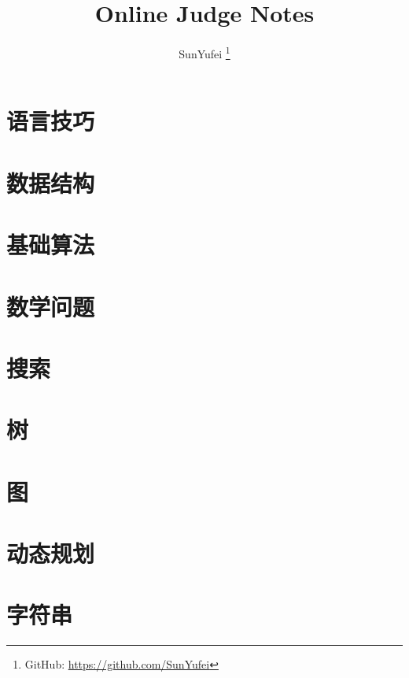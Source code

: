 \documentclass{template}
\title{Online Judge Notes}
\author{SunYufei \thanks{GitHub: \href{https://github.com/SunYufei}{https://github.com/SunYufei}}}
\begin{document}
	\maketitle
	
	\tableofcontents
	
	\newpage
	\section{语言技巧}
	
	
	\section{数据结构}
	
	
	\newpage
	\section{基础算法}
	
	
	\newpage
	\section{数学问题}
	
	
	\newpage
	\section{搜索}
	
	
	\newpage
	\section{树}
	
	
	\newpage
	\section{图}
	
	
	\newpage
	\section{动态规划}
	
	
	\newpage
	\section{字符串}
	
	
\end{document}
